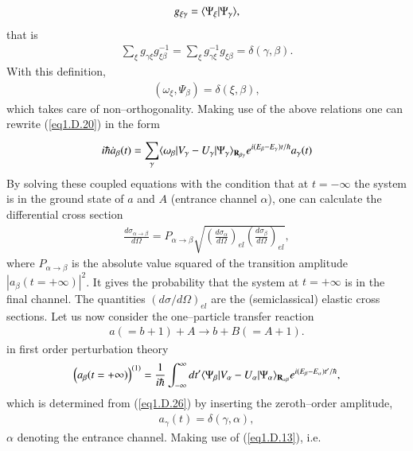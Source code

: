 \begin{subappendices}
\begin{align}\label{eq1.D.23}
g_{\xi\gamma}=\langle {\Psi_\xi|\Psi_\gamma} \rangle,
\end{align}
that is
\begin{align}\label{eq1.D.24}
\sum_{\xi}g_{\gamma\xi}g^{-1}_{\xi\beta}=\sum_{\xi}^{}g^{-1}_{\gamma\xi}g_{\xi\beta}=\delta(\gamma,\beta).
\end{align}
With this definition,
\begin{align}\label{eq1.D.25}
(\omega_\xi,\Psi_\beta)=\delta(\xi,\beta),
\end{align}
which takes care of non--orthogonality. Making use of the above relations one can rewrite (\ref{eq1.D.20}) in the form
\begin{align}\label{eq1.D.26}
i\hbar \dot a_\beta(t)=\sum_{\gamma}^{}\langle {\omega_\beta|V_\gamma-U_\gamma|\Psi_\gamma} \rangle_{\mathbf R_{\beta\gamma}}e^{i(E_\beta-E_\gamma)t/\hbar}a_\gamma(t)
\end{align}
 By solving these coupled equations with the condition that at $t=-\infty$ the system is in the ground state of $a$ and $A$ (entrance channel $\alpha$), one can calculate the differential cross section
 \begin{align}\label{eq1.D.27}
 \frac{d\sigma_{\alpha\rightarrow\beta}}{d\Omega}=P_{\alpha\rightarrow\beta}\sqrt{\left(\frac{d\sigma_\alpha}{d\Omega}\right)_{el}\left(\frac{d\sigma_\beta}{d\Omega}\right)_{el}},
 \end{align}
 where $P_{\alpha\rightarrow\beta}$ is the absolute value squared of the transition amplitude $|a_{\beta}(t=+\infty)|^2$. It gives the probability that the system at $t=+\infty$ is in the final channel. The quantities $(d\sigma/d\Omega)_{el}$ are the (semiclassical) elastic cross sections. Let us now consider the one--particle transfer reaction
  \begin{align}\label{eq1.D.28}
a(=b+1)+A\rightarrow b+B(=A+1).
  \end{align}
 in first order perturbation theory
  \begin{align}\label{eq1.D.29}
\left(a_\beta(t=+\infty)\right)^{(1)}=\frac{1}{i\hbar}\int_{-\infty}^{\infty}dt'\langle {\Psi_\beta|V_\alpha-U_\alpha|\Psi_\alpha} \rangle_{\mathbf R_{\alpha\beta}}e^{i(E_\beta-E_\alpha)t'/\hbar},
  \end{align}
 which is determined from (\ref{eq1.D.26}) by inserting the zeroth--order amplitude,
  \begin{align}\label{eq1.D.30}
a_{\gamma}(t)=\delta(\gamma,\alpha),
  \end{align}
 $\alpha$ denoting the entrance channel. Making use of (\ref{eq1.D.13}), i.e.

\end{subappendices}
